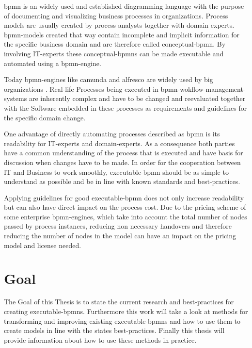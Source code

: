 

\gls{bpmn} is an widely used and established diagramming language with the purpose of documenting and visualizing business processes in organizations. Process models are usually created by process analysts together with domain experts. \gls{bpmn}-models created that way contain incomplete and implicit information for the specific business domain and are therefore called \gls{conceptual-bpmn}. By involving IT-experts these \gls{conceptual-bpmn}s can be made executable and automated using a \gls{bpmn-engine}. \cite{fundamentals}

Today \gls{bpmn-engine}s like \gls{camunda}  and \gls{alfresco} are widely used by big organizations \cite{camunda-customers} \cite{activiti-customers}. Real-life Processes being executed in \gls{bpmn-wokflow-management-system}s are inherently complex and have to be changed and reevaluated together with the Software embedded in these processes as requirements and guidelines for the specific domain change. 

One advantage of directly automating processes described as \gls{bpmn} is its readability for IT-experts and domain-experts. As a consequence both parties have a common understanding of the process that is executed and have basis for discussion when changes have to be made. In order for the cooperation between IT and Business to work smoothly, \gls{executable-bpmn} should be as simple to understand as possible and be in line with known standards and best-practices. 

Applying guidelines for good \gls{executable-bpmn} does not only increase readability but can also have direct impact on the process cost. Due to the pricing scheme of some enterprise \gls{bpmn-engine}s, which take into account the total number of nodes passed by process instances, reducing non necessary handovers and therefore reducing the number of nodes in the model can have an impact on the pricing model and license needed. 

\section{Goal}
The Goal of this Thesis is to state the current research and best-practices for creating  \gls{executable-bpmn}s. Furthermore this work will take a look at methods for transforming and improving existing \gls{executable-bpmn}s and how to use them to create models in line with the states best-practices. Finally this thesis will provide information about how to use these methods in practice. 

